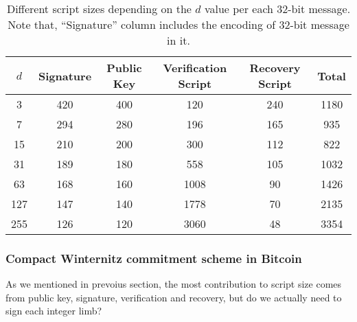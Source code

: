 \documentclass{iacrtrans}
\begin{document}
\iffalse{}
\begin{verbatim}
import math
l = 32
ds = [3, 7, 15, 31, 63, 127, 255]

for d in ds:
    w = math.ceil(math.log(d+1, 2))
    n0 = math.ceil(l / w)
    n1 = math.ceil((2**w * n0).bit_length() / w)
    k = n0 + n1
    
    pk_size = 20 * k
    ver_size = 2 * d * k
    sig_size = 21*k
    rec_size = 0
    for i in range(0, n0):
        rec_size += int(i * w)
    
    total = pk_size + ver_size + rec_size + sig_size
    
    print(f"{d} & {sig_size} & {pk_size} & {ver_size} & {rec_size} & {total} \\\\")
\end{verbatim}
\fi
\begin{table}[H]
  \centering
  \begin{tabular}{cccccc}
    \toprule
    $d$ & \textbf{Signature} & \textbf{Public Key} & \textbf{Verification Script} & \textbf{Recovery Script} & \textbf{Total} \\
    \midrule
    3 & 420 & 400 & 120 & 240 & 1180 \\
    7 & 294 & 280 & 196 & 165 & 935 \\
    15 & 210 & 200 & 300 & 112 & 822 \\
    31 & 189 & 180 & 558 & 105 & 1032 \\
    63 & 168 & 160 & 1008 & 90 & 1426 \\
    127 & 147 & 140 & 1778 & 70 & 2135 \\
    255 & 126 & 120 & 3060 & 48 & 3354 \\
    \bottomrule
  \end{tabular}
  \caption{Different script sizes depending on the $d$ value per each
    32-bit message. Note that, ``Signature'' column includes the
    encoding of 32-bit message in it.}\label{tab:winternitz-script-size}
\end{table}

\subsubsection{Compact Winternitz commitment
  scheme in Bitcoin}\label{sec:compact-winternitz-in-bitcoin}

As we mentioned in prevoius section, the most contribution to script
size comes from public key, signature, verification and recovery, but
do we actually need to sign each integer limb?
\end{document}
